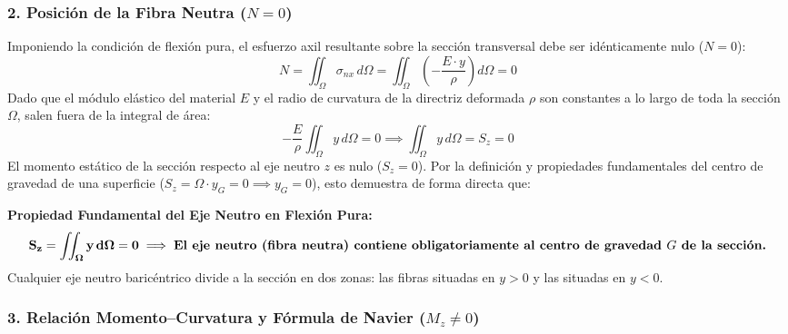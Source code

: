 \subsubsection{2. Posición de la Fibra Neutra ($N = 0$)}

Imponiendo la condición de flexión pura, el esfuerzo axil resultante sobre la sección transversal debe ser idénticamente nulo ($N = 0$):
\begin{equation}
    N = \iint_{\Omega} \sigma_{nx} \, d\Omega = \iint_{\Omega} \left(-\frac{E \cdot y}{\rho}\right) d\Omega = 0
\end{equation}
Dado que el módulo elástico del material $E$ y el radio de curvatura de la directriz deformada $\rho$ son constantes a lo largo de toda la sección $\Omega$, salen fuera de la integral de área:
\begin{equation}
    -\frac{E}{\rho} \iint_{\Omega} y \, d\Omega = 0 \implies \iint_{\Omega} y \, d\Omega = S_z = 0
\end{equation}
El momento estático de la sección respecto al eje neutro $z$ es nulo ($S_z = 0$). Por la definición y propiedades fundamentales del centro de gravedad de una superficie ($S_z = \Omega \cdot y_G = 0 \implies y_G = 0$), esto demuestra de forma directa que:
\begin{tcolorbox}[colback=blue!4!white, colframe=myb!85!black, arc=3pt, boxrule=0.8pt]
    \textbf{Propiedad Fundamental del Eje Neutro en Flexión Pura:}
    \begin{equation}
        \mathbf{S_z = \iint_{\Omega} y \, d\Omega = 0 \implies \text{\textbf{El eje neutro (fibra neutra) contiene obligatoriamente al centro de gravedad $G$ de la sección.}}}
    \end{equation}
    Cualquier eje neutro baricéntrico divide a la sección en dos zonas: las fibras situadas en $y > 0$ y las situadas en $y < 0$.
\end{tcolorbox}

\subsubsection{3. Relación Momento--Curvatura y Fórmula de Navier ($M_z \neq 0$)}

